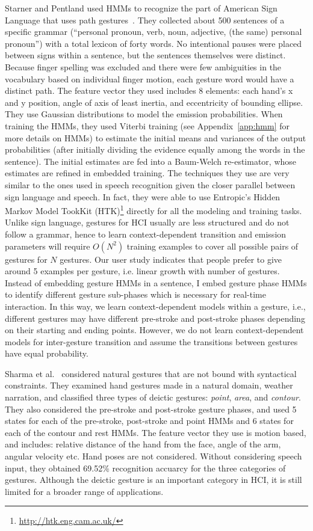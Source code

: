 Starner and Pentland used HMMs to recognize the part of American Sign Language
that uses path gestures~\cite{Starner95}. They collected about 500 sentences of a specific grammar (``personal pronoun, verb, noun, adjective, (the same) personal pronoun'') with a total lexicon of
forty words. No intentional pauses were placed between signs within a
sentence, but the sentences themselves were distinct. Because finger spelling
was excluded and there were few ambiguities in the
vocabulary based on individual finger motion, each gesture word would have a
distinct path.
The feature vector they used includes 8 elements:
each hand's x and y position, angle of axis of least inertia, and eccentricity of bounding ellipse.
They use Gaussian distributions to model the emission probabilities.
When training the HMMs, they used Viterbi training (see Appendix~\ref{app:hmm}
for more details on HMMs) to estimate the initial means and variances of the
output probabilities (after initially dividing the evidence equally among the
words in the sentence).
The initial estimates are fed into a Baum-Welch re-estimator, whose estimates are refined in embedded training.
The techniques they use are very similar to the ones used in speech
recognition given the closer parallel between sign language and speech. In fact,
they were able to use Entropic's Hidden Markov Model TookKit (HTK)\footnote{\url{http://htk.eng.cam.ac.uk/}} directly for all
the modeling and training tasks. Unlike
sign language, gestures for HCI usually are less structured and do not follow a
grammar, hence to learn context-dependent transition and emission parameters will require $O(N^2)$
training examples to cover all possible pairs of gestures for
$N$ gestures.
Our user study indicates that people prefer to give around 5 examples per
gesture, i.e. linear growth with number of gestures. Instead of embedding gesture HMMs in a
sentence, I embed gesture phase HMMs to identify different gesture sub-phases
which is necessary for real-time interaction.
In this way, we learn context-dependent models within a gesture, i.e.,
different gestures may have different pre-stroke and post-stroke phases
depending on their starting and ending points. However, we do not learn
context-dependent models for inter-gesture transition and assume the transitions
between gestures have equal probability.

Sharma et al.~\cite{sharma00} considered natural gestures that are not
bound with syntactical constraints. They examined hand gestures made in a
natural domain, weather narration, and classified three types of
deictic gestures:
\textit{point}, \textit{area}, and \textit{contour}. They also
considered the pre-stroke and post-stroke gesture phases, and used 5 states for
each of the pre-stroke, post-stroke and point HMMs and 6 states for each of the
contour and rest HMMs. The feature vector they use is motion based, and
includes: relative distance of the hand from the face, angle of the arm, angular
velocity etc. Hand poses are not considered. Without considering speech input,
they obtained 69.52\% recognition accuarcy for the three categories of gestures.
Although the deictic gesture is an important category in HCI, it is still
limited for a broader range of applications.

